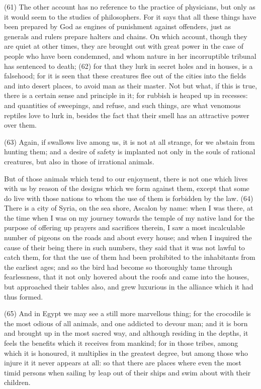 (61) The other account has no reference to the practice of physicians, but only as it would seem to
the studies of philosophers. For it says that all these things have been prepared by God as
engines of punishment against offenders, just as generals and rulers prepare halters and chains.
On which account, though they are quiet at other times, they are brought out with great power in the
case of people who have been condemned, and whom nature in her incorruptible tribunal has
sentenced to death; (62) for that they lurk in secret holes and in houses, is a falsehood; for it is
seen that these creatures flee out of the cities into the fields and into desert places, to avoid man
as their master. Not but what, if this is true, there is a certain sense and principle in it; for rubbish is
heaped up in recesses: and quantities of sweepings, and refuse, and such things, are what
venomous reptiles love to lurk in, besides the fact that their smell has an attractive power over
them.

(63) Again, if swallows live among us, it is not at all strange, for we abstain from hunting them; and
a desire of safety is implanted not only in the souls of rational creatures, but also in those of
irrational animals.

But of those animals which tend to our enjoyment, there is not one which lives with us by reason of
the designs which we form against them, except that some do live with those nations to whom the
use of them is forbidden by the law. (64) There is a city of Syria, on the sea shore, Ascalon by
name: when I was there, at the time when I was on my journey towards the temple of my native land
for the purpose of offering up prayers and sacrifices therein, I saw a most incalculable number of
pigeons on the roads and about every house; and when I inquired the cause of their being there in
such numbers, they said that it was not lawful to catch them, for that the use of them had been
prohibited to the inhabitants from the earliest ages; and so the bird had become so thoroughly
tame through fearlessness, that it not only hovered about the roofs and came into the houses, but
approached their tables also, and grew luxurious in the alliance which it had thus formed.

(65) And in Egypt we may see a still more marvellous thing; for the crocodile is the most odious of
all animals, and one addicted to devour man; and it is born and brought up in the most sacred way,
and although residing in the depths, it feels the benefits which it receives from mankind; for in those
tribes, among which it is honoured, it multiplies in the greatest degree, but among those who injure
it it never appears at all: so that there are places where even the most timid persons when sailing
by leap out of their ships and swim about with their children.

